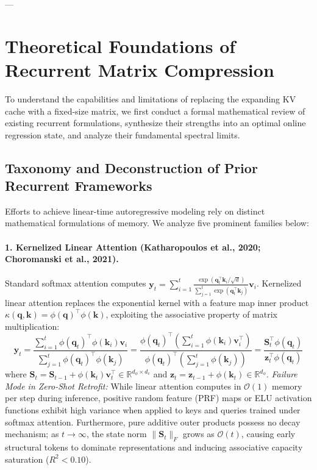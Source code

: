 \documentclass[11pt,a4paper]{article}
\begin{document}
---

\section{Theoretical Foundations of Recurrent Matrix Compression}
\label{sec:theory}

To understand the capabilities and limitations of replacing the expanding KV cache with a fixed-size matrix, we first conduct a formal mathematical review of existing recurrent formulations, synthesize their strengths into an optimal online regression state, and analyze their fundamental spectral limits.

\subsection{Taxonomy and Deconstruction of Prior Recurrent Frameworks}
\label{sec:prior_recurrent}

Efforts to achieve linear-time autoregressive modeling rely on distinct mathematical formulations of memory. We analyze five prominent families below:

\paragraph{1. Kernelized Linear Attention (Katharopoulos et al., 2020; Choromanski et al., 2021).}
Standard softmax attention computes $\mathbf{y}_t = \sum_{i=1}^t \frac{\exp(\mathbf{q}_t^\top \mathbf{k}_i / \sqrt{d})}{\sum_{j=1}^t \exp(\mathbf{q}_t^\top \mathbf{k}_j)} \mathbf{v}_i$. Kernelized linear attention replaces the exponential kernel with a feature map inner product $\kappa(\mathbf{q}, \mathbf{k}) = \phi(\mathbf{q})^\top \phi(\mathbf{k})$, exploiting the associative property of matrix multiplication:
\begin{equation}
\mathbf{y}_t = \frac{\sum_{i=1}^t \phi(\mathbf{q}_t)^\top \phi(\mathbf{k}_i) \mathbf{v}_i}{\sum_{j=1}^t \phi(\mathbf{q}_t)^\top \phi(\mathbf{k}_j)} = \frac{\phi(\mathbf{q}_t)^\top \left(\sum_{i=1}^t \phi(\mathbf{k}_i)\mathbf{v}_i^\top\right)}{\phi(\mathbf{q}_t)^\top \left(\sum_{j=1}^t \phi(\mathbf{k}_j)\right)} = \frac{\mathbf{S}_t^\top \phi(\mathbf{q}_t)}{\mathbf{z}_t^\top \phi(\mathbf{q}_t)}
\end{equation}
where $\mathbf{S}_t = \mathbf{S}_{t-1} + \phi(\mathbf{k}_t)\mathbf{v}_t^\top \in \mathbb{R}^{d_\phi \times d_v}$ and $\mathbf{z}_t = \mathbf{z}_{t-1} + \phi(\mathbf{k}_t) \in \mathbb{R}^{d_\phi}$.
\textit{Failure Mode in Zero-Shot Retrofit:} While linear attention computes in $\mathcal{O}(1)$ memory per step during inference, positive random feature (PRF) maps or ELU activation functions exhibit high variance when applied to keys and queries trained under softmax attention. Furthermore, pure additive outer products possess no decay mechanism; as $t \to \infty$, the state norm $\|\mathbf{S}_t\|_F$ grows as $\mathcal{O}(t)$, causing early structural tokens to dominate representations and inducing associative capacity saturation ($R^2 < 0.10$).
\end{document}

